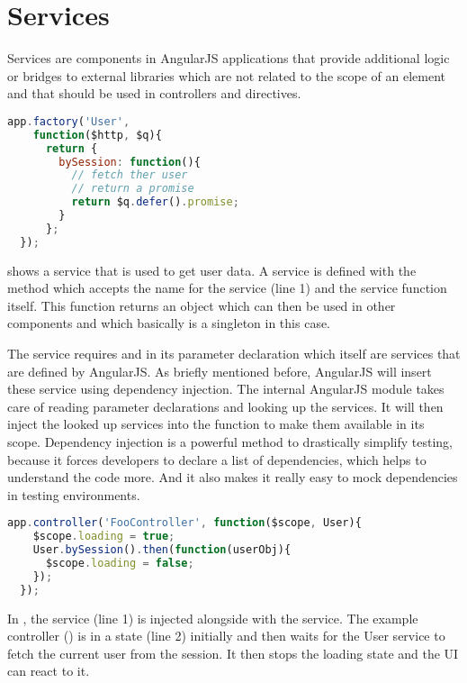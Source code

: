 \section{Services}
\label{sect:services}

Services are components in AngularJS applications that provide additional logic or bridges to external libraries which are not related to the scope of an element and that should be used in controllers and directives.

\begin{lstlisting}[language=JavaScript, caption=A simple AngularJS service, label=lst:angular-service]
  app.factory('User',
    function($http, $q){
      return {
        bySession: function(){
          // fetch ther user
          // return a promise
          return $q.defer().promise;
        }
      };
  });
\end{lstlisting}

 shows a  service that is used to get user data. A service is defined with the  method which accepts the name for the service (line 1) and the service function itself. This function returns an object which can then be used in other components and which basically is a singleton in this case. 

The service requires  and  in its parameter declaration which itself are services that are defined by AngularJS. As briefly mentioned before, AngularJS will insert these service using dependency injection. The internal AngularJS module  takes care of reading parameter declarations and looking up the services. It will then inject the looked up services into the function to make them available in its scope. Dependency injection is a powerful method to drastically simplify testing, because it forces developers to declare a list of dependencies, which helps to understand the code more. And it also makes it really easy to mock dependencies in testing environments.

\begin{lstlisting}[language=JavaScript, caption=Using a custom service, label=lst:angular-service-example]
  app.controller('FooController', function($scope, User){
    $scope.loading = true;
    User.bySession().then(function(userObj){
      $scope.loading = false;
    });
  });
\end{lstlisting}

In , the  service (line 1) is injected alongside with the  service. The example controller () is in a  state (line 2) initially and then waits for the User service to fetch the current user from the session. It then stops the loading state and the UI can react to it.